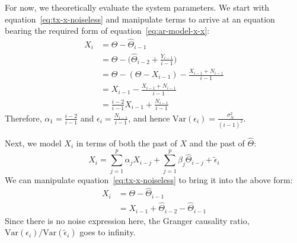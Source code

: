 \documentclass[letterpaper, 10pt, conference]{ieeeconf}
\begin{document}
For now, we theoretically evaluate the system parameters. We start with equation~\eqref{eq:tx-x-noiseless} and manipulate terms to arrive at an equation bearing the required form of equation~\eqref{eq:ar-model-x-x}:
\begin{align*}
	X_i &= \Theta - \widehat\Theta_{i-1} \\
		&= \Theta - \big( \widehat\Theta_{i-2} + \frac{Y_{i-1}}{i-1} \big) \\
		&= \Theta - (\Theta - X_{i-1}) - \frac{X_{i-1} + N_{i-1}}{i-1} \\
		&= X_{i-1} - \frac{X_{i-1} + N_{i-1}}{i-1} \\
		&= \frac{i-2}{i-1} X_{i-1} + \frac{N_{i-1}}{i-1}
\end{align*}
Therefore, $\alpha_1 = \frac{i-2}{i-1}$ and $\epsilon_i = \frac{N_{i-1}}{i-1}$, and hence $\text{Var}(\epsilon_i) = \frac{\sigma_N^2}{(i-1)^2}$.

Next, we model $X_i$ in terms of both the past of $X$ and the past of $\widehat\Theta$:
\begin{equation}
	X_i = \sum_{j=1}^{p}{\alpha_j X_{i-j}} + \sum_{j=1}^{p}{\beta_j \widehat\Theta_{i-j}} + \tilde\epsilon_i \label{eq:ar-model-x-x-theta}
\end{equation}
We can manipulate equation~\eqref{eq:tx-x-noiseless} to bring it into the above form:
\begin{align*}
	X_i &= \Theta - \widehat\Theta_{i-1} \\
		&= X_{i-1} + \widehat\Theta_{i-2} - \widehat\Theta_{i-1}
\end{align*}
Since there is no noise expression here, the Granger causality ratio, $\text{Var}(\epsilon_i) / \text{Var}(\tilde\epsilon_i)$ goes to infinity.
\end{document}
